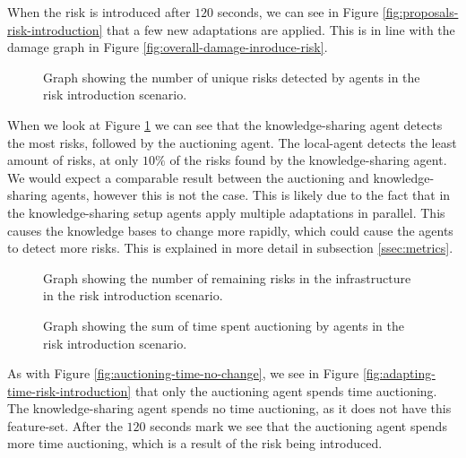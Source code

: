 When the risk is introduced after $120$ seconds, we can see in Figure \ref{fig:proposals-risk-introduction} that a few new adaptations are applied. This is in line with the damage graph in Figure \ref{fig:overall-damage-inroduce-risk}.

\begin{figure}[H]
    \centering
        
    \caption{Graph showing the number of unique risks detected by agents in the risk introduction scenario.}
    \label{fig:risk-count-risk-introduction}
\end{figure}

When we look at Figure \ref{fig:risk-count-risk-introduction} we can see that the knowledge-sharing agent detects the most risks, followed by the auctioning agent. The local-agent detects the least amount of risks, at only $10\%$ of the risks found by the knowledge-sharing agent. We would expect a comparable result between the auctioning and knowledge-sharing agents, however this is not the case. This is likely due to the fact that in the knowledge-sharing setup agents apply multiple adaptations in parallel. This causes the knowledge bases to change more rapidly, which could cause the agents to detect more risks. This is explained in more detail in subsection \ref{ssec:metrics}.

\begin{figure}[H]
    \centering
        
    \caption{Graph showing the number of remaining risks in the infrastructure in the risk introduction scenario.}
    \label{fig:risk-remaining-risk-introduction}
\end{figure}


\begin{figure}[H]
    \hspace*{-1cm}
    \centering
        
    \caption{Graph showing the sum of time spent auctioning by agents in the risk introduction scenario.}
    \label{fig:auctioning-time-risk-introduction}
\end{figure}

As with Figure \ref{fig:auctioning-time-no-change}, we see in Figure \ref{fig:adapting-time-risk-introduction} that only the auctioning agent spends time auctioning. The knowledge-sharing agent spends no time auctioning, as it does not have this feature-set. After the $120$ seconds mark we see that the auctioning agent spends more time auctioning, which is a result of the risk being introduced.

